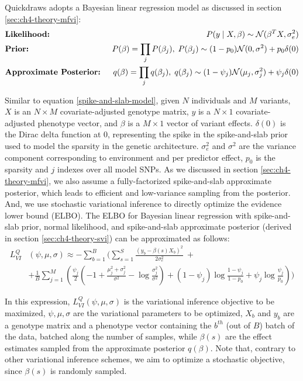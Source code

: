 Quickdraws adopts a Bayesian linear regression model as discussed in section \ref{sec:ch4-theory-mfvi}:
\begin{align}
    &\text{\textbf{Likelihood:} } &P(y \mid X, \beta) \sim \mathcal{N}(\beta^T X, \sigma_e^2) \nonumber \\
    &\text{\textbf{Prior:} } &P(\beta) = \prod_j P(\beta_j), \hspace{1mm} P(\beta_j) \sim (1-p_0)\mathcal{N} (0, \sigma ^ 2) + p_0 \delta(0) \nonumber \\
    &\text{\textbf{Approximate Posterior:} } &q(\beta) = \prod_j q(\beta_j), \hspace{1mm} q(\beta_j) \sim (1-\psi_j)\mathcal{N}(\mu_j, \sigma^2_j) + \psi_j \delta(0) \label{spike-and-slab-model2}
\end{align}

Similar to equation \ref{spike-and-slab-model}, given $N$ individuals and $M$ variants, $X$ is an $N \times M$ covariate-adjusted genotype matrix, $y$ is a $N \times 1$ covariate-adjusted phenotype vector, and $\beta$ is a $M \times 1$ vector of variant effects.
%
$\delta(0)$ is the Dirac delta function at 0, representing the spike in the spike-and-slab prior used to model the sparsity in the genetic architecture.
%
$\sigma_e^2$ and $\sigma^2$ are the variance component corresponding to environment and per predictor effect, $p_0$ is the sparsity and $j$ indexes over all model SNPs.
%
As we discussed in section \ref{sec:ch4-theory-mfvi}, we also assume a fully-factorized spike-and-slab approximate posterior, which leads to efficient and low-variance sampling from the posterior.
%
And, we use stochastic variational inference to directly optimize the evidence lower bound (ELBO).
%
The ELBO for Bayesian linear regression with spike-and-slab prior, normal likelihood, and spike-and-slab approximate posterior (derived in section \ref{sec:ch4-theory-svi}) can be approximated as follows: 
\begin{align}
    L^{Q}_{VI}&(\psi, \mu, \sigma) \approx - \sum\limits^{B}_{b=1} \Bigg( \sum\limits^{S}_{s=1} \frac{(y_b - \beta(s) X_b)^2}{2 \sigma_e^2} \ + \nonumber \\
    &+ \frac{1}{B}\sum\limits^{M}_{j=1} \left(  \frac{\psi_j}{2}\left(-1 + \frac{\mu_j^2 + \sigma_j^2}{\sigma^2} - \log \frac{\sigma_j^2}{\sigma^2} \right) + (1-\psi_j)\log\frac{1 - \psi_j}{1 - p_0} + \psi_j\log\frac{\psi_j}{p_0} \right) \Bigg) \label{elbo-loss-ss}
\end{align}

In this expression, $L^{Q}_{VI}(\psi, \mu, \sigma)$ is the variational inference objective to be maximized, $\psi, \mu, \sigma$ are the variational parameters to be optimized, $X_b$ and $y_b$ are a genotype matrix and a phenotype vector containing the $b^{th}$ (out of $B$) batch of the data, batched along the number of samples, while $\beta(s)$ are the effect estimates sampled from the approximate posterior $q(\beta)$.
%
Note that, contrary to other variational inference schemes, we aim to optimize a stochastic objective, since $\beta(s)$ is randomly sampled.
%

